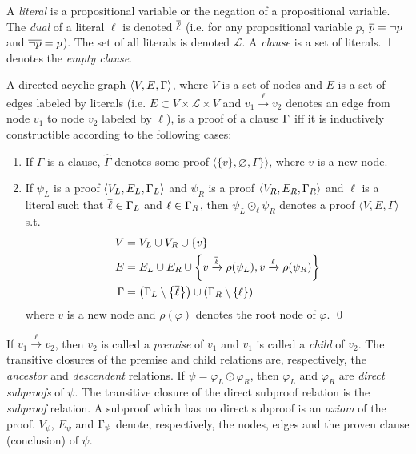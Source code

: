 \documentclass{llncs}
\begin{document}
A \emph{literal} is a propositional variable or the negation of a propositional variable. The
\emph{dual} of a literal $\ell$ is denoted $\overline{\ell}$ (i.e. for any propositional variable $p$,
$\overline{p} = \neg p$ and $\overline{\neg p} = p$). The set of all literals is denoted $\mathcal{L}$. A
\emph{clause} is a set of literals. $\bot$ denotes the \emph{empty clause}.


\newcommand{\axiom}[1]{\widehat{#1}}
\newcommand{\n}{v}
\newcommand{\raiz}[1]{\rho(#1)}

\begin{definition}[Proof] 
\label{def:proof}
A directed acyclic graph $\langle V, E, \Gamma \rangle$, where $V$ is a set of nodes and $E$ is a
set of edges labeled by literals (i.e. $E \subset V \times \mathcal{L} \times V$ and $\n_1
\xrightarrow{\ell} \n_2$ denotes an edge from node $\n_1$ to node $\n_2$ labeled by $\ell$), is a
proof of a clause $\Gamma$ iff it is inductively constructible according to the following cases:
%
\begin{enumerate}
  \item If $\Gamma$ is a clause, $\axiom{\Gamma}$ denotes some proof $\langle \{ \n \}, \varnothing,
    \Gamma \} \rangle$, where $\n$ is a new node.
  \item If $\psi_L$ is a proof $\langle V_L, E_L, \Gamma_L \rangle$ and
    $\psi_R$ is a proof $\langle V_R, E_R, \Gamma_R \rangle$ and $\ell$ is a literal such that
    $\overline{\ell} \in \Gamma_L$ and $\ell \in \Gamma_R$, then
    $\psi_L \odot_\ell \psi_R$ denotes a proof $\langle V, E, \Gamma \rangle$ s.t.
    \begin{align*}
      V &= V_L \cup V_R \cup \{\n \} \\
      E &= E_L \cup E_R \cup
                    \left\{ \n \xrightarrow{\dual{\ell}} \raiz{\psi_L}, \n \xrightarrow{\ell} \raiz{\psi_R} \right\} \\
     \Gamma &= \left( \clause_L \setminus \left\{ \dual{\ell} \right\} \right) \cup \left( \clause_R
                    \setminus \left\{ \ell \right\} \right)
    \end{align*}
    where $\n$ is a new node and $\raiz{\varphi}$ denotes the root node of $\varphi$.
  \qed
\end{enumerate}
\end{definition}


\newcommand{\Vertices}[1]{V_{#1}}
\newcommand{\Edges}[1]{E_{#1}}
\newcommand{\Conclusion}[1]{\clause_{#1}}

\noindent
If $\n_1 \xrightarrow{\ell} \n_2$, then $\n_2$ is called a \emph{premise} of $\n_1$ and $\n_1$ is
called a \emph{child} of $\n_2$. The transitive closures of the premise and child relations are,
respectively, the \emph{ancestor} and \emph{descendent} relations. If $\psi = \varphi_L \odot
\varphi_R$, then $\varphi_L$ and $\varphi_R$ are \emph{direct subproofs} of $\psi$. The transitive
closure of the direct subproof relation is the \emph{subproof} relation. A subproof which has no
direct subproof is an \emph{axiom} of the proof.
%
$\Vertices{\psi}$, $\Edges{\psi}$ and $\Conclusion{\psi}$
denote, respectively, the nodes, edges and the proven clause (conclusion) of $\psi$.
\end{document}
